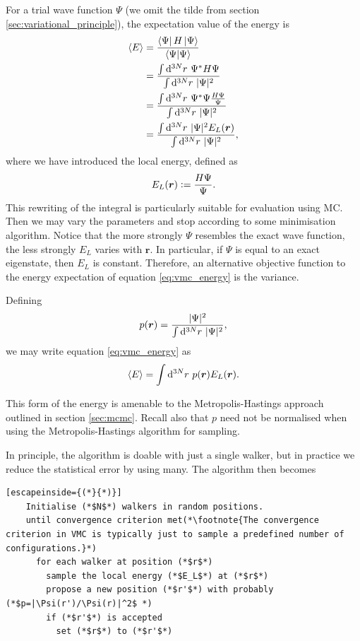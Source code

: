 For a trial wave function $\Psi$ (we omit the tilde from section \ref{sec:variational_principle}), the expectation value of the energy is
\begin{align}
    \label{eq:vmc_energy}
    \langle E \rangle &= \frac{\bra{\Psi}H\ket{\Psi}}{\bra{\Psi}\ket{\Psi}} \\
    \label{eq:vmc_step1}
    &= \frac{\int\d^{3N}r\ \Psi^*H\Psi}{\int\d^{3N}r\ |\Psi|^2} \\
    \label{eq:vmc_step2}
    &= \frac{\int\d^{3N}r\ \Psi^*\Psi \frac{H\Psi}{\Psi}}{\int\d^{3N}r\ |\Psi|^2} \\
    \label{eq:vmc_step3}
    &= \frac{\int\d^{3N}r\ |\Psi|^2 E_L(\bm r)}{\int\d^{3N}r\ |\Psi|^2},
\end{align}
where we have introduced the local energy, defined as
\begin{equation}
    E_L(\bm r) \mathrel{\mathop:}= \frac{H\Psi}{\Psi}.
\end{equation}
This rewriting of the integral is particularly suitable for evaluation using \gls{MC}. Then we may vary the parameters and stop according to some minimisation algorithm.
Notice that the more strongly $\Psi$ resembles the exact wave function, the less strongly $E_L$ varies with $\bm r$. In particular, if $\Psi$ is equal to an exact eigenstate, then $E_L$ is constant. Therefore, an alternative objective function to the energy expectation of equation \ref{eq:vmc_energy} is the variance.\supercite{cuzzocreaVariational2020,snajdrAre2000,kentMonte1999}

Defining
\begin{equation}
    p(\bm r) = \frac{|\Psi|^2}{\int\mathrm{d}^{3N}r\ |\Psi|^2},
\end{equation}
we may write equation \ref{eq:vmc_energy} as
\begin{equation}
    \langle E\rangle = \int\mathrm{d}^{3N}r\ p(\bm r)E_L(\bm r).
\end{equation}

This form of the energy is amenable to the Metropolis-Hastings approach outlined in section \ref{sec:mcmc}. Recall also that $p$ need not be normalised when using the Metropolis-Hastings algorithm for sampling.

In principle, the algorithm is doable with just a single walker, but in practice we reduce the statistical error by using many. The algorithm then becomes

\begin{lstlisting}[escapeinside={(*}{*)}]
    Initialise (*$N$*) walkers in random positions.
    until convergence criterion met(*\footnote{The convergence criterion in VMC is typically just to sample a predefined number of configurations.}*)
      for each walker at position (*$r$*)
        sample the local energy (*$E_L$*) at (*$r$*)
        propose a new position (*$r'$*) with probably (*$p=|\Psi(r')/\Psi(r)|^2$ *)
        if (*$r'$*) is accepted
          set (*$r$*) to (*$r'$*)
\end{lstlisting}

